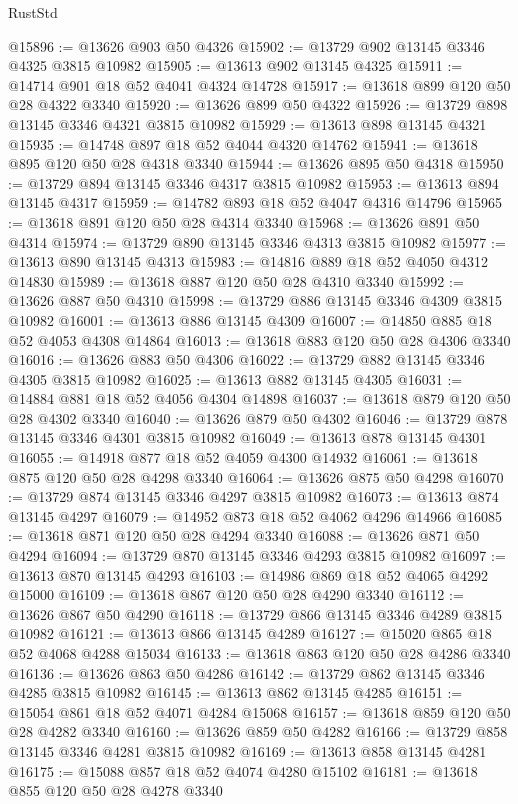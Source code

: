 \begin{lexlean}{RustStd}
\begin{coremodule}
@15896 := @13626 @903 @50 @4326
@15902 := @13729 @902 @13145 @3346 @4325 @3815 @10982
@15905 := @13613 @902 @13145 @4325
@15911 := @14714 @901 @18 @52 @4041 @4324 @14728
@15917 := @13618 @899 @120 @50 @28 @4322 @3340
@15920 := @13626 @899 @50 @4322
@15926 := @13729 @898 @13145 @3346 @4321 @3815 @10982
@15929 := @13613 @898 @13145 @4321
@15935 := @14748 @897 @18 @52 @4044 @4320 @14762
@15941 := @13618 @895 @120 @50 @28 @4318 @3340
@15944 := @13626 @895 @50 @4318
@15950 := @13729 @894 @13145 @3346 @4317 @3815 @10982
@15953 := @13613 @894 @13145 @4317
@15959 := @14782 @893 @18 @52 @4047 @4316 @14796
@15965 := @13618 @891 @120 @50 @28 @4314 @3340
@15968 := @13626 @891 @50 @4314
@15974 := @13729 @890 @13145 @3346 @4313 @3815 @10982
@15977 := @13613 @890 @13145 @4313
@15983 := @14816 @889 @18 @52 @4050 @4312 @14830
@15989 := @13618 @887 @120 @50 @28 @4310 @3340
@15992 := @13626 @887 @50 @4310
@15998 := @13729 @886 @13145 @3346 @4309 @3815 @10982
@16001 := @13613 @886 @13145 @4309
@16007 := @14850 @885 @18 @52 @4053 @4308 @14864
@16013 := @13618 @883 @120 @50 @28 @4306 @3340
@16016 := @13626 @883 @50 @4306
@16022 := @13729 @882 @13145 @3346 @4305 @3815 @10982
@16025 := @13613 @882 @13145 @4305
@16031 := @14884 @881 @18 @52 @4056 @4304 @14898
@16037 := @13618 @879 @120 @50 @28 @4302 @3340
@16040 := @13626 @879 @50 @4302
@16046 := @13729 @878 @13145 @3346 @4301 @3815 @10982
@16049 := @13613 @878 @13145 @4301
@16055 := @14918 @877 @18 @52 @4059 @4300 @14932
@16061 := @13618 @875 @120 @50 @28 @4298 @3340
@16064 := @13626 @875 @50 @4298
@16070 := @13729 @874 @13145 @3346 @4297 @3815 @10982
@16073 := @13613 @874 @13145 @4297
@16079 := @14952 @873 @18 @52 @4062 @4296 @14966
@16085 := @13618 @871 @120 @50 @28 @4294 @3340
@16088 := @13626 @871 @50 @4294
@16094 := @13729 @870 @13145 @3346 @4293 @3815 @10982
@16097 := @13613 @870 @13145 @4293
@16103 := @14986 @869 @18 @52 @4065 @4292 @15000
@16109 := @13618 @867 @120 @50 @28 @4290 @3340
@16112 := @13626 @867 @50 @4290
@16118 := @13729 @866 @13145 @3346 @4289 @3815 @10982
@16121 := @13613 @866 @13145 @4289
@16127 := @15020 @865 @18 @52 @4068 @4288 @15034
@16133 := @13618 @863 @120 @50 @28 @4286 @3340
@16136 := @13626 @863 @50 @4286
@16142 := @13729 @862 @13145 @3346 @4285 @3815 @10982
@16145 := @13613 @862 @13145 @4285
@16151 := @15054 @861 @18 @52 @4071 @4284 @15068
@16157 := @13618 @859 @120 @50 @28 @4282 @3340
@16160 := @13626 @859 @50 @4282
@16166 := @13729 @858 @13145 @3346 @4281 @3815 @10982
@16169 := @13613 @858 @13145 @4281
@16175 := @15088 @857 @18 @52 @4074 @4280 @15102
@16181 := @13618 @855 @120 @50 @28 @4278 @3340

\end{coremodule}
\end{lexlean}
